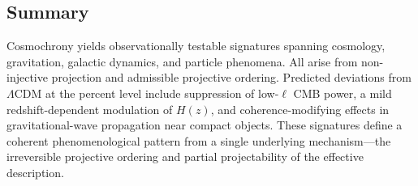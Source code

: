 \subsection{Summary}
  \label{subsec:summary-predictions}

  Cosmochrony yields observationally testable signatures spanning
  cosmology, gravitation, galactic dynamics, and particle phenomena.
  All arise from non-injective projection and admissible projective ordering.
  Predicted deviations from $\Lambda$CDM at the percent level include
  suppression of low-$\ell$ CMB power, a mild redshift-dependent
  modulation of $H(z)$, and coherence-modifying effects in
  gravitational-wave propagation near compact objects.
  These signatures define a coherent phenomenological pattern from a single
  underlying mechanism---the irreversible projective ordering and partial
  projectability of the effective description.
